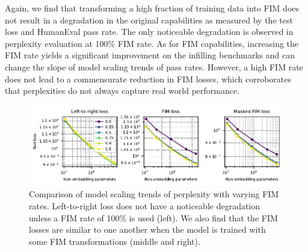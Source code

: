 \documentclass[postscript]{article}
\begin{document}
Again, we find that transforming a high fraction of training data into FIM does not result in a degradation in the original capabilities as measured by the test loss and HumanEval pass rate. The only noticeable degradation is observed in perplexity evaluation at 100\% FIM rate. As for FIM capabilities, increasing the FIM rate yields a significant improvement on the infilling benchmarks and can change the slope of model scaling trends of pass rates. However, a high FIM rate does not lead to a commensurate reduction in FIM losses, which corroborates that perplexities do not always capture real world performance.


\begin{figure}[ht!]
\centering
\includegraphics[width=\textwidth]{figures/fim-rate-loss-vs-compute.pdf}
\caption{Comparison of model scaling trends of perplexity with varying FIM rates. Left-to-right loss does not have a noticeable degradation unless a FIM rate of 100\% is used (left). We also find that the FIM losses are similar to one another when the model is trained with some FIM transformations (middle and right).}
\label{fig:fim-rate:loss}
\end{figure}
\end{document}
